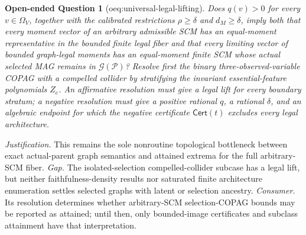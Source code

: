 \documentclass{article}
\newtheorem{openendedquestion}{Open-ended Question}
\begin{document}
\begin{openendedquestion}[oeq:universal-legal-lifting]\label{oeq:universal-legal-lifting}
Does \(q(v)>0\) for every \(v\in\Omega_V\), together with the calibrated restrictions \(\rho\ge\delta\) and \(d_M\ge\delta\), imply both that every moment vector of an arbitrary admissible SCM has an equal-moment representative in the bounded finite legal fiber and that every limiting vector of bounded graph-legal moments has an equal-moment finite SCM whose actual selected MAG remains in \(\mathcal G(\mathcal P)\)? Resolve first the binary three-observed-variable COPAG with a compelled collider by stratifying the invariant essential-feature polynomials \(Z_e\). An affirmative resolution must give a legal lift for every boundary stratum; a negative resolution must give a positive rational \(q\), a rational \(\delta\), and an algebraic endpoint for which the negative certificate \(\mathsf{Cert}(t)\) excludes every legal architecture.
\end{openendedquestion}
\par\smallskip\noindent \textit{Justification.} This remains the sole nonroutine topological bottleneck between exact actual-parent graph semantics and attained extrema for the full arbitrary-SCM fiber. \textit{Gap.} The isolated-selection compelled-collider subcase has a legal lift, but neither faithfulness-density results nor saturated finite architecture enumeration settles selected graphs with latent or selection ancestry. \textit{Consumer.} Its resolution determines whether arbitrary-SCM selection-COPAG bounds may be reported as attained; until then, only bounded-image certificates and subclass attainment have that interpretation.
\end{document}
